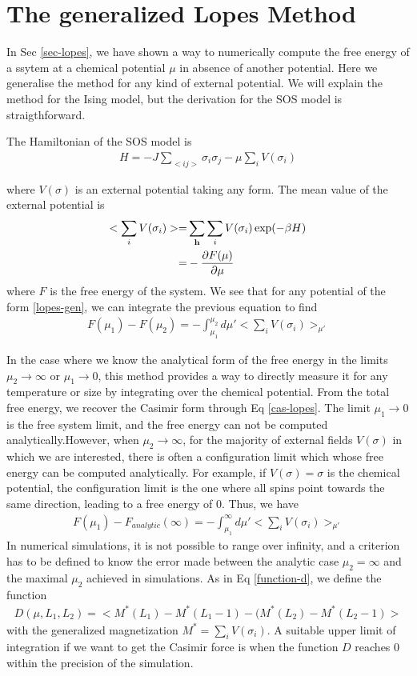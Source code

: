     \section{The generalized Lopes Method}
{\color{blue}
In Sec \ref{sec-lopes}, we have shown a way to numerically compute the free energy of a ssytem at a chemical potential $\mu$ in absence of another potential. Here we generalise the method for any kind of external potential. We will explain the method for the Ising model, but the derivation for the SOS model is straigthforward.

The Hamiltonian of the SOS model is
\begin{align}
    H = - J \sum_{<ij>} \sigma_i \sigma_j - \mu \sum_i V(\sigma_i)
\end{align}

where $V(\sigma)$ is an external potential taking any form. The mean value of the external potential is
\begin{align}
    <  \sum_i V(\sigma_i) > =&  \sum_{\bf h} \sum_i V(\sigma_i) \exp(-\beta H) \nonumber \\
    =&  - \frac{\partial F(\mu)}{\partial \mu}
\end{align}
where $F$ is the free energy of the system. We see that for any potential of the form \eqref{lopes-gen}, we can integrate the previous equation to find
\begin{align}
   F(\mu_1) - F(\mu_2) = - \int_{\mu_1}^{\mu_2} d\mu'  < \sum_i V(\sigma_i) >_{\mu'} 
   \label{lopes-gen}
\end{align}

In the case where we know the analytical form of the free energy in the limits $\mu_2 \to \infty$ or $\mu_1 \to 0$, this method provides a way to directly measure it for any temperature or size by integrating over the chemical potential.
From the total free energy, we recover the Casimir form through Eq \eqref{cas-lopes}.
The limit $\mu_1 \to 0$ is the free system limit, and the free energy can not be computed analytically.However, when $\mu_2 \to \infty$, for  the majority of external fields $V(\sigma)$ in which we are interested, there is often a configuration limit which whose free energy can be computed analytically. For example, if $V(\sigma)=\sigma$ is the chemical potential, the configuration limit is the one where all spins point towards the same direction, leading to a free energy of $0$. Thus, we have
\begin{align}
   F(\mu_1) - F_{analytic}(\infty) = - \int_{\mu_1}^{\infty} d\mu'  < \sum_i V(\sigma_i) >_{\mu'} 
   \label{lopes-gen}
\end{align}
In numerical simulations, it is not possible to range over infinity, and a criterion has to be defined to know the error made between the analytic case $\mu_2 = \infty$ and the maximal $\mu_2$ achieved in simulations. As in Eq \eqref{function-d}, we define the function
\begin{align}
    D(\mu,L_1,L_2) =  < M^\ast(L_1)-M^\ast(L_1-1) - (M^\ast(L_2)-M^\ast(L_2-1) >
\end{align}
with the generalized magnetization $M^\ast = \sum_i V(\sigma_i)$. A suitable upper limit of integration if we want to get the Casimir force is when the function $D$ reaches $0$ within the precision of the simulation.


}
